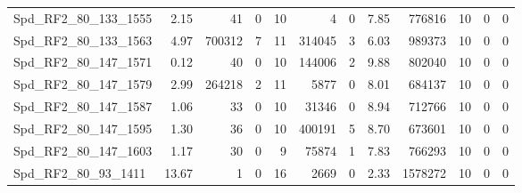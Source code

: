 \begin{longtable}[c]{@{}lrrrrrrrrrrr@{}}
Spd\_RF2\_80\_133\_1555       & 2.15                   & 41                      & 0                       & 10                     & 4                       & 0                       & 7.85                    & 776816                   & 10                       & 0                        & 0                        \\
Spd\_RF2\_80\_133\_1563       & 4.97                   & 700312                  & 7                       & 11                     & 314045                  & 3                       & 6.03                    & 989373                   & 10                       & 0                        & 0                        \\
Spd\_RF2\_80\_147\_1571       & 0.12                   & 40                      & 0                       & 10                     & 144006                  & 2                       & 9.88                    & 802040                   & 10                       & 0                        & 0                        \\
Spd\_RF2\_80\_147\_1579       & 2.99                   & 264218                  & 2                       & 11                     & 5877                    & 0                       & 8.01                    & 684137                   & 10                       & 0                        & 0                        \\
Spd\_RF2\_80\_147\_1587       & 1.06                   & 33                      & 0                       & 10                     & 31346                   & 0                       & 8.94                    & 712766                   & 10                       & 0                        & 0                        \\
Spd\_RF2\_80\_147\_1595       & 1.30                   & 36                      & 0                       & 10                     & 400191                  & 5                       & 8.70                    & 673601                   & 10                       & 0                        & 0                        \\
Spd\_RF2\_80\_147\_1603       & 1.17                   & 30                      & 0                       & 9                      & 75874                   & 1                       & 7.83                    & 766293                   & 10                       & 0                        & 0                        \\
Spd\_RF2\_80\_93\_1411        & 13.67                  & 1                       & 0                       & 16                     & 2669                    & 0                       & 2.33                    & 1578272                  & 10                       & 0                        & 0                        \\

\end{longtable}
